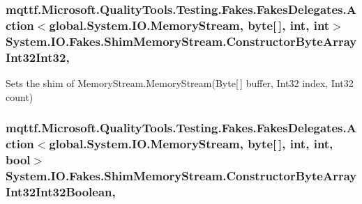 \hypertarget{class_system_1_1_i_o_1_1_fakes_1_1_shim_memory_stream_a5130817d46b3623f02a7dbac8ae6f258}{
\subsubsection[{Constructor\-Byte\-Array\-Int32\-Int32}]{\setlength{\rightskip}{0pt plus 5cm}mqttf.\-Microsoft.\-Quality\-Tools.\-Testing.\-Fakes.\-Fakes\-Delegates.\-Action$<$global.\-System.\-I\-O.\-Memory\-Stream, byte\mbox{[}$\,$\mbox{]}, int, int$>$ System.\-I\-O.\-Fakes.\-Shim\-Memory\-Stream.\-Constructor\-Byte\-Array\-Int32\-Int32\hspace{0.3cm}{\ttfamily [static]}, {\ttfamily [set]}}}\label{class_system_1_1_i_o_1_1_fakes_1_1_shim_memory_stream_a5130817d46b3623f02a7dbac8ae6f258}


Sets the shim of Memory\-Stream.\-Memory\-Stream(\-Byte\mbox{[}$\,$\mbox{]} buffer, Int32 index, Int32 count)

\hypertarget{class_system_1_1_i_o_1_1_fakes_1_1_shim_memory_stream_ad11098fcac68358e11d689f4645f73a3}{
\subsubsection[{Constructor\-Byte\-Array\-Int32\-Int32\-Boolean}]{\setlength{\rightskip}{0pt plus 5cm}mqttf.\-Microsoft.\-Quality\-Tools.\-Testing.\-Fakes.\-Fakes\-Delegates.\-Action$<$global.\-System.\-I\-O.\-Memory\-Stream, byte\mbox{[}$\,$\mbox{]}, int, int, bool$>$ System.\-I\-O.\-Fakes.\-Shim\-Memory\-Stream.\-Constructor\-Byte\-Array\-Int32\-Int32\-Boolean\hspace{0.3cm}{\ttfamily [static]}, {\ttfamily [set]}}}\label{class_system_1_1_i_o_1_1_fakes_1_1_shim_memory_stream_ad11098fcac68358e11d689f4645f73a3}


